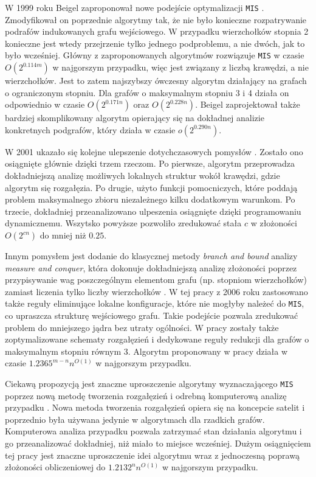 \documentclass[12pt]{article}
\begin{document}
W 1999 roku Beigel zaproponował nowe podejście optymalizacji \texttt{MIS} \cite{beigel1999finding}. Zmodyfikował on poprzednie algorytmy tak, że nie było konieczne rozpatrywanie podrafów indukowanych grafu wejściowego. W przypadku wierzchołków stopnia 2 konieczne jest wtedy przejrzenie tylko jednego podproblemu, a nie dwóch, jak to było wcześniej. Główny z zaproponowanych algorytmów rozwiązuje \texttt{MIS} w czasie $O(2^{0.114m})$ w najgorszym przypadku, więc jest związany z liczbą krawędzi, a nie wierzchołków. Jest to zatem najszybszy ówczesny algorytm działający na grafach o ograniczonym stopniu. Dla grafów o maksymalnym stopniu 3 i 4 działa on odpowiednio w czasie $O(2^{0.171n})$ oraz $O(2^{0.228n})$. Beigel zaprojektował także bardziej skomplikowany algorytm opierający się na dokładnej analizie konkretnych podgrafów, który działa w czasie $o(2^{0.290n})$.

W 2001 ukazało się kolejne ulepszenie dotychczasowych pomysłów \cite{robson2001finding}. Zostało ono osiągnięte głównie dzięki trzem rzeczom. Po pierwsze, algorytm przeprowadza dokładniejszą analizę możliwych lokalnych struktur wokół krawędzi, gdzie algorytm się rozgałęzia. Po drugie, użyto funkcji pomocniczych, które poddają problem maksymalnego zbioru niezależnego kilku dodatkowym warunkom. Po trzecie, dokładniej przeanalizowano ulpeszenia osiągnięte dzięki programowaniu dynamicznemu. Wszytsko powyższe pozwoliło zredukować stała $c$ w złożoności $O(2^{cn})$ do mniej niż $0.25$.

Innym pomysłem jest dodanie do klasycznej metody \textit{branch and bound} analizy \textit{measure and conquer}, która dokonuje dokładniejszą analizę złożoności poprzez przypisywanie wag poszczególnym elementom grafu (np. stopniom wierzchołków) zamiast liczenia tylko liczby wierzchołków \cite{furer2006faster}. W tej pracy z 2006 roku zastosowano także reguły eliminujące lokalne konfiguracje, które nie mogłyby należeć do \texttt{MIS}, co upraszcza strukturę wejściowego grafu. Takie podejście pozwala zredukować problem do mniejszego jądra bez utraty ogólności. W pracy zostały także zoptymalizowane schematy rozgałęzień i dedykowane reguły redukcji dla grafów o maksymalnym stopniu równym 3. Algorytm proponowany w pracy działa w czasie $1.2365^{m-n}n^{O(1)}$ w najgorszym przypadku.

Ciekawą propozycją jest znaczne uproszczenie algorytmy wyznaczającego \texttt{MIS} poprzez nową metodę tworzenia rozgałęzień i odrebną komputerową analizę przypadku \cite{kneis2009fine}. Nowa metoda tworzenia rozgałęzień opiera się na koncepcie satelit i poprzednio była używana jedynie w algorytmach dla rzadkich grafów. Komputerowa analiza przypadku pozwala zatrzymać stan działania algorytmu i go przeanalizować dokładniej, niż miało to miejsce wcześniej. Dużym osiągnięciem tej pracy jest znaczne uproszczenie idei algorytmu wraz z jednoczesną poprawą złożoności obliczeniowej do $1.2132^nn^{O(1)}$ w najgorszym przypadku.
\end{document}

